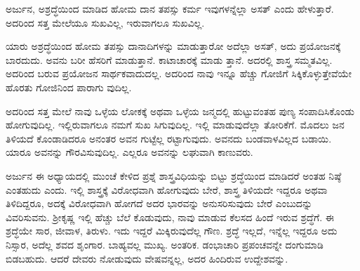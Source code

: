{\small ಅರ್ಜುನ, ಅಶ್ರದ್ಧೆಯಿಂದ ಮಾಡಿದ ಹೋಮ ದಾನ ತಪಸ್ಸು ಕರ್ಮ ಇವುಗಳನ್ನೆಲ್ಲಾ ಅಸತ್ ಎಂದು ಹೇಳುತ್ತಾರೆ. ಅದರಿಂದ ಸತ್ತ ಮೇಲೆಯೂ ಸುಖವಿಲ್ಲ, ಇರುವಾಗಲೂ ಸುಖವಿಲ್ಲ.}

ಯಾರು ಅಶ್ರದ್ಧೆಯಿಂದ ಹೋಮ ತಪಸ್ಸು ದಾನಾದಿಗಳನ್ನು ಮಾಡುತ್ತಾರೋ ಅದೆಲ್ಲಾ ಅಸತ್, ಅದು ಪ್ರಯೋಜನಕ್ಕೆ ಬಾರದುದು. ಅವನು ಬರೀ ಹೆಸರಿಗೆ ಮಾಡುತ್ತಾನೆ. ಕಾಟಾಚಾರಕ್ಕೆ ಮಾಡು ತ್ತಾನೆ. ಅದರಲ್ಲಿ ಶಾಸ್ತ್ರ ಸಮ್ಮತವಿಲ್ಲ. ಅದರಿಂದ ಬರುವ ಪ್ರಯೋಜನ ಸಾರ್ಥಕವಾದುದಲ್ಲ. ಅದರಿಂದ ನಾವು ಇನ್ನೂ ಹೆಚ್ಚು ಗೋಜಿಗೆ ಸಿಕ್ಕಿಕೊಳ್ಳುತ್ತೇವೆಯೇ ಹೊರತು ಗೋಜಿನಿಂದ ಪಾರಾಗು ವುದಿಲ್ಲ.

ಅದರಿಂದ ಸತ್ತ ಮೇಲೆ ನಾವು ಒಳ್ಳೆಯ ಲೋಕಕ್ಕೆ ಅಥವಾ ಒಳ್ಳೆಯ ಜನ್ಮದಲ್ಲಿ ಹುಟ್ಟುವಂತಹ ಪುಣ್ಯ ಸಂಪಾದಿಸಿಕೊಂಡು ಹೋಗುವುದಿಲ್ಲ. ಇಲ್ಲಿರುವಾಗಲೂ ನಮಗೆ ಸುಖ ಸಿಗುವುದಿಲ್ಲ. ಇಲ್ಲಿ ಮಾಡುವುದೆಲ್ಲಾ ತೋರಿಕೆಗೆ. ಮೊದಲು ಜನ ತಿಳಿಯದೆ ಕೊಂಡಾಡಿದರೂ ಅನಂತರ ಅವನ ಗುಟ್ಟೆಲ್ಲ ರಟ್ಟಾಗುವುದು. ಅವನದು ಬಂಡವಾಳವಿಲ್ಲದ ಬಡಾಯಿ. ಯಾರೂ ಅವನನ್ನು ಗೌರವಿಸುವುದಿಲ್ಲ. ಎಲ್ಲರೂ ಅವನನ್ನು ಲಘುವಾಗಿ ಕಾಣುವರು.

ಅರ್ಜುನ ಈ ಅಧ್ಯಾಯದಲ್ಲಿ ಮುಂಚೆ ಕೇಳಿದ ಪ್ರಶ್ನೆ ಶಾಸ್ತ್ರವಿಧಿಯನ್ನು ಬಿಟ್ಟು ಶ್ರದ್ಧೆಯಿಂದ ಮಾಡಿದರೆ ಅಂತಹ ನಿಷ್ಠೆ ಎಂತಹುದು ಎಂದು. ಇಲ್ಲಿ ಶಾಸ್ತ್ರಕ್ಕೆ ವಿರೋಧವಾಗಿ ಹೋಗುವುದು ಬೇರೆ, ಶಾಸ್ತ್ರ ತಿಳಿಯದೇ ಇದ್ದರೂ ಅಥವಾ ತಿಳಿದಿದ್ದರೂ, ಅದಕ್ಕೆ ವಿರೋಧವಾಗಿ ಹೋಗದೆ ಅದರ ಭಾರವನ್ನು ಅನುಸರಿಸುವುದು ಬೇರೆ ಎಂಬುದನ್ನು ವಿವರಿಸುವನು. ಶ್ರೀಕೃಷ್ಣ ಇಲ್ಲಿ ಹೆಚ್ಚು ಬೆಲೆ ಕೊಡುವುದು, ನಾವು ಮಾಡುವ ಕೆಲಸದ ಹಿಂದೆ ಇರುವ ಶ್ರದ್ಧೆಗೆ. ಈ ಶ್ರದ್ಧೆಯೇ ಸಾರ, ಜೀವಾಳ, ತಿರುಳು. ಇದು ಇದ್ದರೆ ಮಿಕ್ಕಿರುವುದೆಲ್ಲ ಗೌಣ. ಶ್ರದ್ಧೆ ಇಲ್ಲದೆ, ಇನ್ನೆಲ್ಲ ಇದ್ದರೂ ಅದು ನಿಸ್ಸಾರ, ಅದೆಲ್ಲ ಶವದ ಶೃಂಗಾರ. ಬಾಹ್ಯವಲ್ಲ ಮುಖ್ಯ. ಅಂತರಿಕ. ಡಂಭಾಚಾರಿ ಪ್ರಪಂಚವನ್ನೇ ದಂಗುಮಾಡಿ ಬಿಡಬಹುದು. ಆದರೆ ದೇವರು ನೋಡುವುದು ವೇಷವನ್ನಲ್ಲ, ಅದರ ಹಿಂದಿರುವ ಉದ್ದೇಶವನ್ನು.

